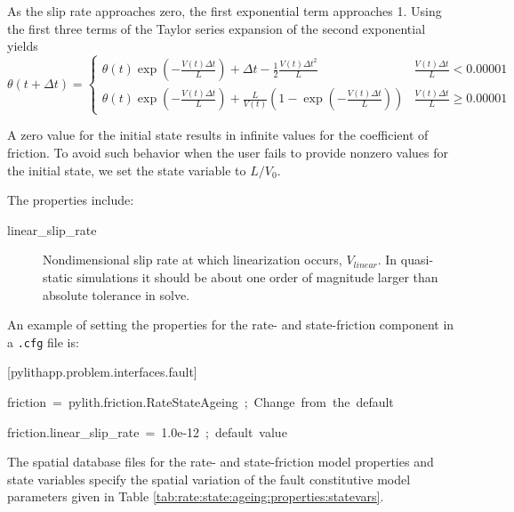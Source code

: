 As the slip rate approaches zero, the first exponential term approaches
1. Using the first three terms of the Taylor series expansion of the
second exponential yields
\begin{equation}
\theta(t+\Delta t)=\begin{cases}
\theta(t)\exp\left(-\frac{V(t)\Delta t}{L}\right)+\Delta t-\frac{1}{2}\frac{V(t)\Delta t^{2}}{L} & \frac{V(t)\Delta t}{L}<0.00001\\
\theta(t)\exp\left(-\frac{V(t)\Delta t}{L}\right)+\frac{L}{V(t)}\left(1-\exp\left(-\frac{V(t)\Delta t}{L}\right)\right) & \frac{V(t)\Delta t}{L}\ge0.00001
\end{cases}
\end{equation}


A zero value for the initial state results in infinite values for
the coefficient of friction. To avoid such behavior when the user
fails to provide nonzero values for the initial state, we set the
state variable to $L/V_{0}$.

The properties include:
\begin{description}
\item [{linear\_slip\_rate}] Nondimensional slip rate at which linearization
occurs, $V_{linear}$. In quasi-static simulations it should be about
one order of magnitude larger than absolute tolerance in solve.
\end{description}
An example of setting the properties for the rate- and state-friction
component in a \texttt{.cfg} file is:
\begin{lyxcode}
{\footnotesize{}{[}pylithapp.problem.interfaces.fault{]}}{\footnotesize \par}

{\footnotesize{}friction~=~pylith.friction.RateStateAgeing~;~Change~from~the~default}{\footnotesize \par}

{\footnotesize{}friction.linear\_slip\_rate~=~1.0e-12~;~default~value}{\footnotesize \par}
\end{lyxcode}
The spatial database files for the rate- and state-friction model
properties and state variables specify the spatial variation of the
fault constitutive model parameters given in Table \ref{tab:rate:state:ageing:properties:statevars}.

